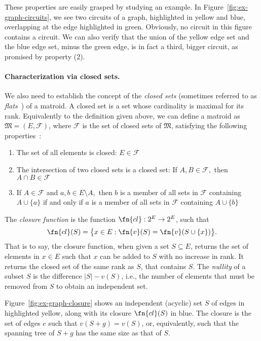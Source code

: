 These properties are easily grasped by studying an example. In Figure~\ref{fig:ex-graph-circuits}, we see two circuits of a graph, highlighted in yellow and blue, overlapping at the edge highlighted in green. Obviously, no circuit in this figure contains a circuit. We can also verify that the union of the yellow edge set and the blue edge set, minus the green edge, is in fact a third, bigger circuit, as promised by property (2).

\paragraph{Characterization via closed sets.} We also need to establish the concept of the \textit{closed sets} (sometimes referred to as \textit{flats}~\cite{schrijver-2003}) of a matroid. A closed set is a set whose cardinality is maximal for its rank. Equivalently to the definition given above, we can define a matroid as $\mathfrak{M} = (E, \mathcal{F})$, where $\mathcal{F}$ is the set of closed sets of $\mathfrak{M}$, satisfying the following properties~\cite{knuth-1975}:

\begin{enumerate}
  \item The set of all elements is closed: $E \in \mathcal{F}$
  \item The intersection of two closed sets is a closed set: If $A,B \in \mathcal{F},$ then $A \cap B \in \mathcal{F}$
  \item If $A \in \mathcal{F}$ and $a,b \in E \setminus A,$ then $b$ is a member of all sets in $\mathcal{F}$ containing $A \cup \{a\}$ if and only if $a$ is a member of all sets in $\mathcal{F}$ containing $A \cup \{b\}$
\end{enumerate}

The \textit{closure function} is the function $\fn{cl} : 2^E \to 2^E$, such that $$\fn{cl}(S) = \bigl\{ x \in E : \fn{v}(S) = \fn{v}(S \cup \{x\}) \bigr\}.$$ That is to say, the closure function, when given a set $S \subseteq E$, returns the set of elements in $x \in E$ such that $x$ can be added to $S$ with no increase in rank. It returns the closed set of the same rank as $S$, that contains $S$. The \textit{nullity} of a subset $S$ is the difference $|S| - v(S)$, i.e., the number of elements that must be removed from $S$ to obtain an independent set.

Figure~\ref{fig:ex-graph-closure} shows an independent (acyclic) set $S$ of edges in highlighted yellow, along with its closure $\fn{cl}(S)$ in blue. The closure is the set of edges $e$ such that $v(S+g) = v(S)$, or, equivalently, such that the spanning tree of $S+g$ has the same size as that of $S$.

